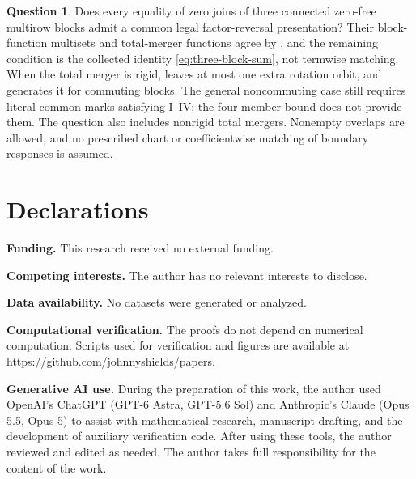 \documentclass[11pt,a4paper]{amsart}
\numberwithin{equation}{section}
\theoremstyle{plain}
\theoremstyle{definition}
\newtheorem{question}[theorem]{Question}
\begin{document}
\begin{question}\label{q:overlapping-supports}
Does every equality of zero joins of three connected zero-free multirow blocks admit a common legal factor-reversal presentation?  Their block-function multisets and total-merger functions agree by , and the remaining condition is the collected identity \eqref{eq:three-block-sum}, not termwise matching.  When the total merger is rigid,  leaves at most one extra rotation orbit, and  generates it for commuting blocks.  The general noncommuting case still requires literal common marks satisfying I--IV; the four-member bound does not provide them.  The question also includes nonrigid total mergers.  Nonempty overlaps are allowed, and no prescribed chart or coefficientwise matching of boundary responses is assumed.
\end{question}

\section*{Declarations}
{\footnotesize
\noindent\textbf{Funding.} This research received no external funding.

\smallskip
\noindent\textbf{Competing interests.} The author has no relevant interests to disclose.

\smallskip
\noindent\textbf{Data availability.} No datasets were generated or analyzed.

\smallskip
\noindent\textbf{Computational verification.} The proofs do not depend on numerical computation.  Scripts used for verification and figures are available at \url{https://github.com/johnnyshields/papers}.

\smallskip
\noindent\textbf{Generative AI use.} During the preparation of this work, the author used OpenAI's ChatGPT (GPT-6 Astra, GPT-5.6 Sol) and Anthropic's Claude (Opus 5.5, Opus 5) to assist with mathematical research, manuscript drafting, and the development of auxiliary verification code.  After using these tools, the author reviewed and edited as needed.  The author takes full responsibility for the content of the work.\par}
\end{document}
